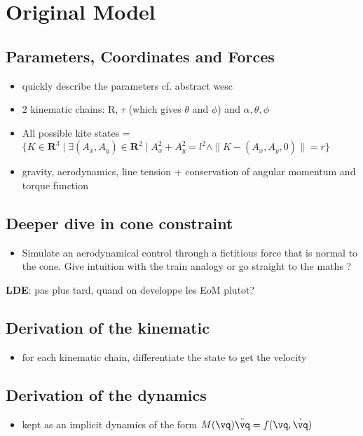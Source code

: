 
\section{Original Model}

\subsection{Parameters, Coordinates and Forces}
\begin{itemize}
 \item quickly describe the parameters cf. abstract wesc
 \item 2 kinematic chains: R, $\tau$ (which gives $\theta$ and $\phi$) and $\alpha, \theta, \phi$
 \item All possible kite states = $\{K \in \mathbf{R}^3 \mid \exists (A_x, A_y) \in \mathbf{R}^2 \mid A_x^2 + A_y^2 = l^2 \land \|K - (A_x, A_y, 0)\| = r\}$
 \item gravity, aerodynamics, line tension + conservation of angular momentum and torque function
\end{itemize}

\subsection{Deeper dive in cone constraint}
\begin{itemize}
 \item Simulate an aerodynamical control through a fictitious force that is normal to the cone. Give intuition with the train analogy or go straight to the maths ?
\end{itemize}

\textbf{LDE}: pas plus tard, quand on developpe les EoM plutot?

\subsection{Derivation of the kinematic}
\begin{itemize}
 \item for each kinematic chain, differentiate the state to get the velocity
\end{itemize}

\subsection{Derivation of the dynamics}
\begin{itemize}
 \item kept as an implicit dynamics of the form $M(\vq)\ddot{\vq} = f(\vq, \dot{\vq})$
\end{itemize}

